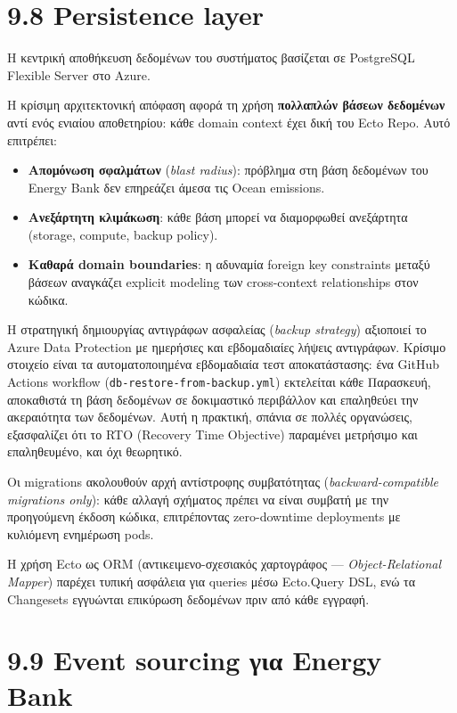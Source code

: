 \section{9.8 Persistence layer}\label{persistence-layer}

Η κεντρική αποθήκευση δεδομένων του συστήματος βασίζεται σε PostgreSQL
Flexible Server στο Azure.

Η κρίσιμη αρχιτεκτονική απόφαση αφορά τη χρήση \textbf{πολλαπλών βάσεων
δεδομένων} αντί ενός ενιαίου αποθετηρίου: κάθε domain context έχει δική
του Ecto Repo. Αυτό επιτρέπει:

\begin{itemize}
\tightlist
\item
  \textbf{Απομόνωση σφαλμάτων} (\emph{blast radius}): πρόβλημα στη βάση
  δεδομένων του Energy Bank δεν επηρεάζει άμεσα τις Ocean emissions.
\item
  \textbf{Ανεξάρτητη κλιμάκωση}: κάθε βάση μπορεί να διαμορφωθεί
  ανεξάρτητα (storage, compute, backup policy).
\item
  \textbf{Καθαρά domain boundaries}: η αδυναμία foreign key constraints
  μεταξύ βάσεων αναγκάζει explicit modeling των cross-context
  relationships στον κώδικα.
\end{itemize}

Η στρατηγική δημιουργίας αντιγράφων ασφαλείας (\emph{backup strategy})
αξιοποιεί το Azure Data Protection με ημερήσιες και εβδομαδιαίες λήψεις
αντιγράφων. Κρίσιμο στοιχείο είναι τα αυτοματοποιημένα εβδομαδιαία τεστ
αποκατάστασης: ένα GitHub Actions workflow
(\texttt{db-restore-from-backup.yml}) εκτελείται κάθε Παρασκευή,
αποκαθιστά τη βάση δεδομένων σε δοκιμαστικό περιβάλλον και επαληθεύει
την ακεραιότητα των δεδομένων. Αυτή η πρακτική, σπάνια σε πολλές
οργανώσεις, εξασφαλίζει ότι το RTO (Recovery Time Objective) παραμένει
μετρήσιμο και επαληθευμένο, και όχι θεωρητικό.

Οι migrations ακολουθούν αρχή αντίστροφης συμβατότητας
(\emph{backward-compatible migrations only}): κάθε αλλαγή σχήματος
πρέπει να είναι συμβατή με την προηγούμενη έκδοση κώδικα, επιτρέποντας
zero-downtime deployments με κυλιόμενη ενημέρωση pods.

Η χρήση Ecto ως ORM (αντικειμενο-σχεσιακός χαρτογράφος ---
\emph{Object-Relational Mapper}) παρέχει τυπική ασφάλεια για queries
μέσω Ecto.Query DSL, ενώ τα Changesets εγγυώνται επικύρωση δεδομένων
πριν από κάθε εγγραφή.

\section{9.9 Event sourcing για Energy
Bank}\label{event-sourcing-ux3b3ux3b9ux3b1-energy-bank}

